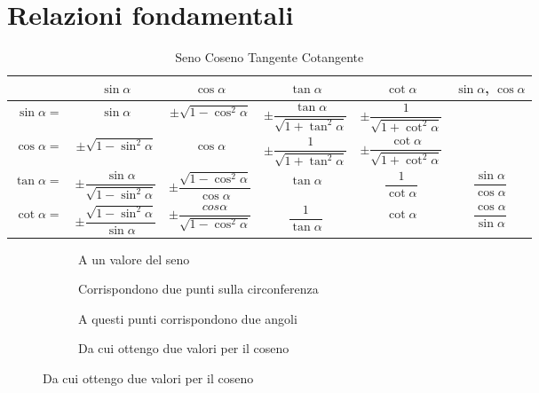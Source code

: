 \section{Relazioni fondamentali}
\label{sec:RelazioniFondamentali}
\begin{table} %
	\centering
	\renewcommand{\arraystretch}{2}
	\begin{tabular}{rccccc}
	\toprule
	& $\sin\alpha$ &$\cos\alpha$&$\tan\alpha$ &$\cot\alpha$ & $\sin\alpha$, $\cos\alpha$ \\[.6cm]
	\midrule
	$\sin\alpha={}$&$\sin\alpha$ & $\pm\sqrt{1-\cos^2\alpha}$ &$\pm\dfrac{\tan\alpha}{\sqrt{1+\tan^2\alpha}}$ &$\pm\dfrac{1}{\sqrt{1+\cot^2\alpha}}$ & \\ [.6cm]
	$\cos\alpha={}$& $\pm\sqrt{1-\sin^2\alpha}$ &$\cos\alpha$ & $\pm\dfrac{1}{\sqrt{1+\tan^2\alpha}}$ &$\pm\dfrac{\cot\alpha}{\sqrt{1+\cot^2\alpha}}$ & \\ [.6cm]
	$\tan\alpha={}$&$\pm\dfrac{\sin\alpha}{\sqrt{1-\sin^2\alpha}}$ &$\pm\dfrac{\sqrt{1-\cos^2\alpha}}{\cos\alpha}$&$\tan\alpha$ & $\dfrac{1}{\cot\alpha}$ &$\dfrac{\sin\alpha}{\cos\alpha}$\\ [.6cm]
	$\cot\alpha={}$&$\pm\dfrac{\sqrt{1-\sin^2\alpha}}{\sin\alpha}$ &$\pm\dfrac{cos\alpha}{\sqrt{1-\cos^2\alpha}}$ &$\dfrac{1}{\tan\alpha}$ &$\cot\alpha$ &$\dfrac{\cos\alpha}{\sin\alpha}$\\[.6cm] 
	\bottomrule
	\end{tabular}
	\caption{Seno Coseno Tangente Cotangente}
	\label{tab:SenoCosenoTangenteCotangente}
\end{table}
\begin{figure}
	\begin{subfigure}[b]{.5\linewidth}
		\centering
		\caption{A un valore del seno}\label{fig:CosenoNotoSeno1}
	\end{subfigure}%
	\begin{subfigure}[b]{.5\linewidth}
		\centering
		\caption{Corrispondono due punti sulla circonferenza}\label{fig:CosenoNotoSeno2}
	\end{subfigure}
	\begin{subfigure}[b]{.5\linewidth}
		\centering
		\caption{A questi punti corrispondono due angoli}\label{fig:CosenoNotoSeno3}
	\end{subfigure}%
	\begin{subfigure}[b]{.5\linewidth}
		\centering
		\caption{Da cui ottengo due valori per il coseno}\label{fig:CosenoNotoSeno4}
	\end{subfigure}
	\label{fig:CosenoNotoSenoEs1}
\end{figure}
\renewcommand{\arraystretch}{1}
